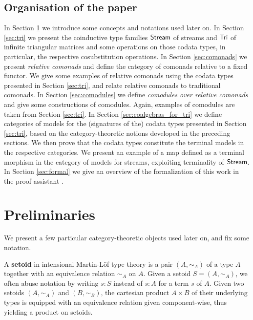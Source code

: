 \documentclass[a4paper,USenglish]{lipics}
\newcommand{\fat}[1]{\textbf{#1}}
\begin{document}
 
 
 \subsection{Organisation of the paper} \label{sec:organisation}
  In Section \ref{sec:preliminaries} we introduce some concepts and notations used later on.
  In Section \ref{sec:tri} we present the coinductive type families $\mathsf{Stream}$ of streams and $\mathsf{Tri}$ of infinite triangular matrices and some operations on those codata types,
  in particular, the respective cosubstitution operations.
  In Section \ref{sec:comonads} we present \emph{relative comonads} and define the category of comonads relative to a fixed functor.
    We give some examples of relative comonads using the codata types presented in Section \ref{sec:tri}, 
    and relate relative comonads to traditional comonads.
  In Section \ref{sec:comodules} we define \emph{comodules over relative comonads} and give some constructions of comodules.
     Again, examples of comodules are taken from Section \ref{sec:tri}.
  In Section \ref{sec:coalgebras_for_tri} we define categories of models for the (signatures of the) codata types presented in Section \ref{sec:tri},
      based on the category-theoretic notions developed in the preceding sections.
      We then prove that the codata types constitute the terminal models in the respective categories.
      We present an example of a map defined as a terminal morphism in the category of models for streams, exploiting terminality of $\mathsf{Stream}$.
  In Section \ref{sec:formal} we give an overview of the formalization of this work in the proof assistant \coq.
  

\section{Preliminaries}\label{sec:preliminaries}

We present a few particular category-theoretic objects used later on, and fix some notation.

\begin{definition}
  A \fat{setoid} in intensional Martin-Löf type theory is a pair $(A, \sim_A)$ of a type $A$ together with an equivalence 
  relation $\sim_A$ on $A$. Given a setoid $S = (A, \sim_A)$, we often abuse notation by writing $s:S$ instead of $s:A$ for
  a term $s$ of $A$.
  Given two setoids $(A,\sim_A)$ and $(B,\sim_B)$, the cartesian product $A\times B$ of their underlying types is equipped with
  an equivalence relation given component-wise, thus yielding a product on setoids.
\end{definition}
\end{document}
